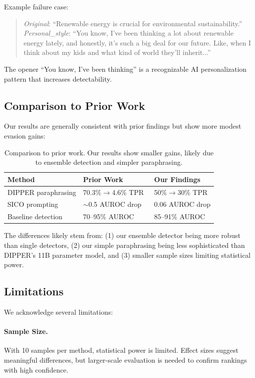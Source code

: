Example failure case:
\begin{quote}
\textit{Original}: ``Renewable energy is crucial for environmental sustainability.''\\
\textit{Personal\_style}: ``You know, I've been thinking a lot about renewable energy lately, and honestly, it's such a big deal for our future. Like, when I think about my kids and what kind of world they'll inherit...''
\end{quote}
The opener ``You know, I've been thinking'' is a recognizable AI personalization pattern that increases detectability.

\subsection{Comparison to Prior Work}

Our results are generally consistent with prior findings but show more modest evasion gains:

\begin{table}[h]
\centering
\caption{Comparison to prior work. Our results show smaller gains, likely due to ensemble detection and simpler paraphrasing.}
\label{tab:comparison}
\small
\begin{tabular}{@{}lll@{}}
\toprule
\textbf{Method} & \textbf{Prior Work} & \textbf{Our Findings} \\
\midrule
DIPPER paraphrasing & 70.3\%$\rightarrow$4.6\% TPR~\citep{krishna2023paraphrasing} & 50\%$\rightarrow$30\% TPR \\
SICO prompting & $\sim$0.5 AUROC drop~\citep{lu2024sico} & 0.06 AUROC drop \\
Baseline detection & 70--95\% AUROC~\citep{dugan2024raid} & 85--91\% AUROC \\
\bottomrule
\end{tabular}
\end{table}

The differences likely stem from: (1) our ensemble detector being more robust than single detectors, (2) our simple paraphrasing being less sophisticated than DIPPER's 11B parameter model, and (3) smaller sample sizes limiting statistical power.

\subsection{Limitations}

We acknowledge several limitations:

\paragraph{Sample Size.} With 10 samples per method, statistical power is limited. Effect sizes suggest meaningful differences, but larger-scale evaluation is needed to confirm rankings with high confidence.

